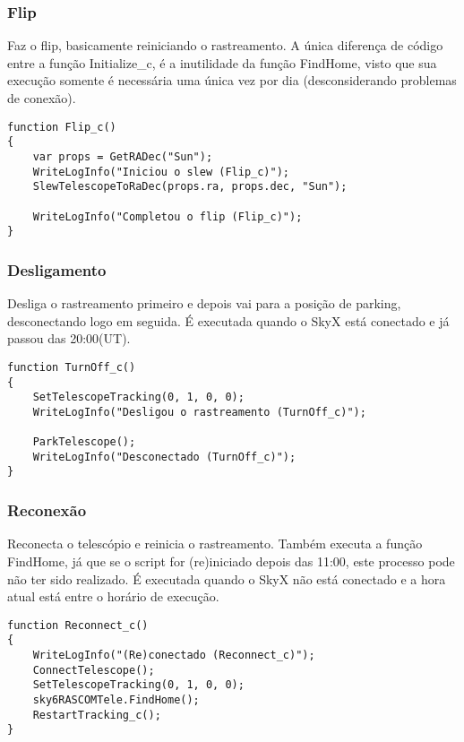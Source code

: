 \documentclass{article}
\begin{document}
\subsubsection{Flip}

Faz o flip, basicamente reiniciando o rastreamento. A única diferença de código entre a função Initialize\_c, é a inutilidade da função FindHome, visto que sua execução somente é necessária uma única vez por dia (desconsiderando problemas de conexão).

\begin{lstlisting}
function Flip_c()
{
    var props = GetRADec("Sun");
    WriteLogInfo("Iniciou o slew (Flip_c)");
    SlewTelescopeToRaDec(props.ra, props.dec, "Sun");

    WriteLogInfo("Completou o flip (Flip_c)");
}
\end{lstlisting}

\subsubsection{Desligamento}

Desliga o rastreamento primeiro e depois vai para a posição de parking, desconectando logo em seguida. É executada quando o SkyX está conectado e já passou das 20:00(UT).

\begin{lstlisting}
function TurnOff_c()
{
    SetTelescopeTracking(0, 1, 0, 0);
    WriteLogInfo("Desligou o rastreamento (TurnOff_c)");

    ParkTelescope();
    WriteLogInfo("Desconectado (TurnOff_c)");
}
\end{lstlisting}

\subsubsection{Reconexão}

Reconecta o telescópio e reinicia o rastreamento. Também executa a função FindHome, já que se o script for (re)iniciado depois das 11:00, este processo pode não ter sido realizado. É executada quando o SkyX não está conectado e a hora atual está entre o horário de execução.

\begin{lstlisting}
function Reconnect_c()
{
    WriteLogInfo("(Re)conectado (Reconnect_c)");
    ConnectTelescope();
    SetTelescopeTracking(0, 1, 0, 0);
    sky6RASCOMTele.FindHome();
    RestartTracking_c();
}
\end{lstlisting}
\end{document}
